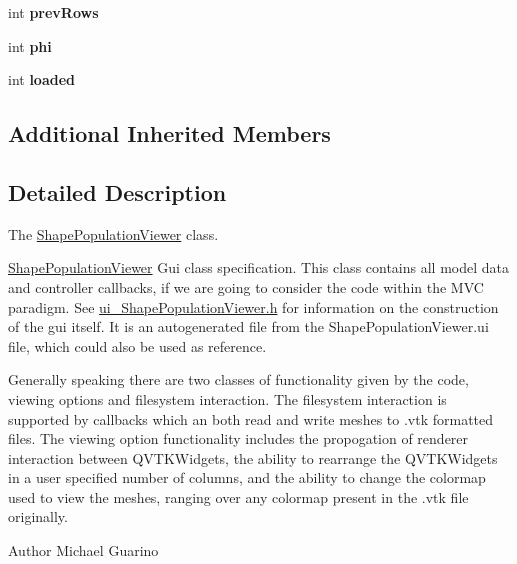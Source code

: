 \begin{DoxyCompactItemize}
\item 
\hypertarget{class_shape_population_viewer_adb72d49a80c7536e0d7ecad1ce3b7fda}{int {\bfseries prev\-Rows}}\label{class_shape_population_viewer_adb72d49a80c7536e0d7ecad1ce3b7fda}

\item 
\hypertarget{class_shape_population_viewer_a722158753a5d11f2f618d59ae743cb0c}{int {\bfseries phi}}\label{class_shape_population_viewer_a722158753a5d11f2f618d59ae743cb0c}

\item 
\hypertarget{class_shape_population_viewer_a6e4ce4ade82b335f5a69ddf054314f16}{int {\bfseries loaded}}\label{class_shape_population_viewer_a6e4ce4ade82b335f5a69ddf054314f16}

\end{DoxyCompactItemize}
\subsection*{Additional Inherited Members}


\subsection{Detailed Description}
The \hyperlink{class_shape_population_viewer}{Shape\-Population\-Viewer} class. 

\hyperlink{class_shape_population_viewer}{Shape\-Population\-Viewer} Gui class specification. This class contains all model data and controller callbacks, if we are going to consider the code within the M\-V\-C paradigm. See \hyperlink{ui___shape_population_viewer_8h_source}{ui\-\_\-\-Shape\-Population\-Viewer.\-h} for information on the construction of the gui itself. It is an autogenerated file from the Shape\-Population\-Viewer.\-ui file, which could also be used as reference.

Generally speaking there are two classes of functionality given by the code, viewing options and filesystem interaction. The filesystem interaction is supported by callbacks which an both read and write meshes to .vtk formatted files. The viewing option functionality includes the propogation of renderer interaction between Q\-V\-T\-K\-Widgets, the ability to rearrange the Q\-V\-T\-K\-Widgets in a user specified number of columns, and the ability to change the colormap used to view the meshes, ranging over any colormap present in the .vtk file originally.

\begin{DoxyAuthor}{Author}
Michael Guarino 
\end{DoxyAuthor}


